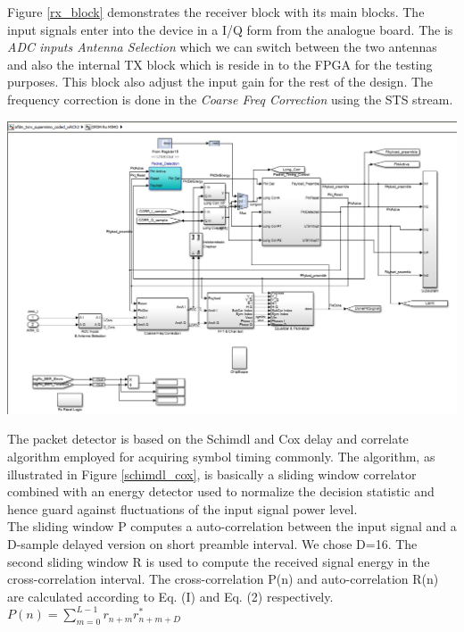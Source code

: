 Figure \ref{rx_block} demonstrates the receiver block with its main blocks. The input signals enter into the device in a I/Q form from the analogue board. The is \textit{ADC inputs Antenna Selection} which we can switch between the two antennas and also the internal TX block which is reside in to the FPGA for the testing purposes. This block also adjust the input gain for the rest of the design. The frequency correction is done in the \textit{Coarse Freq Correction} using the STS stream.  
\begin{center}
\includegraphics[width=\textwidth]{content/fig/rxblock.JPG}
\label{rx_block}
\end{center}

The packet detector is based on the Schimdl and Cox delay and correlate algorithm employed for acquiring symbol timing commonly. The algorithm, as illustrated in Figure \ref{schimdl_cox}, is basically a sliding window correlator combined with an energy detector used to normalize the decision statistic and hence guard against fluctuations of the input signal power level.\\

The sliding window P computes a auto-correlation between the input signal and a D-sample delayed version on short preamble interval. We chose D=16. The second sliding window R is used to compute the received signal energy in the cross-correlation interval. The cross-correlation P(n) and auto-correlation R(n) are calculated according to Eq. (I) and Eq. (2) respectively.\\

$ P(n) = \sum\limits_{m=0}^{L-1} r_{n+m} r^{*}_{n+m+D} $\\

